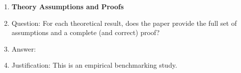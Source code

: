 \documentclass{article}
\begin{document}
\begin{enumerate}
\item {\bf Theory Assumptions and Proofs}
    \item[] Question: For each theoretical result, does the paper provide the full set of assumptions and a complete (and correct) proof?
    \item[] Answer: \answerNA{} %
    \item[] Justification: This is an empirical benchmarking study.


\end{enumerate}
\end{document}
